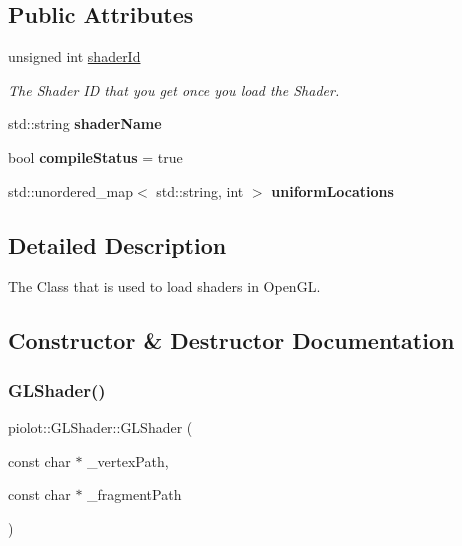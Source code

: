 \subsection*{Public Attributes}
\begin{DoxyCompactItemize}
\item 
\mbox{\label{classpiolot_1_1_g_l_shader_a7f05981084b76212d3ee92c71e002fb2}} 
unsigned int \mbox{\hyperlink{classpiolot_1_1_g_l_shader_a7f05981084b76212d3ee92c71e002fb2}{shader\+Id}}
\begin{DoxyCompactList}\small\item\em The Shader ID that you get once you load the Shader. \end{DoxyCompactList}\item 
\mbox{\label{classpiolot_1_1_g_l_shader_af6cacc0e6d324c39ec3b862dc0ff29a8}} 
std\+::string {\bfseries shader\+Name}
\item 
\mbox{\label{classpiolot_1_1_g_l_shader_aa99f7e5b6b76e8796824278578e4172d}} 
bool {\bfseries compile\+Status} = true
\item 
\mbox{\label{classpiolot_1_1_g_l_shader_adde3ba01aacd0c60bd495ca3b220a1dd}} 
std\+::unordered\+\_\+map$<$ std\+::string, int $>$ {\bfseries uniform\+Locations}
\end{DoxyCompactItemize}


\subsection{Detailed Description}
The Class that is used to load shaders in Open\+GL. 

\subsection{Constructor \& Destructor Documentation}
\mbox{\label{classpiolot_1_1_g_l_shader_a9280ae5003e53461f898dd18b7685eab}} 
\subsubsection{\texorpdfstring{G\+L\+Shader()}{GLShader()}}
{\footnotesize\ttfamily piolot\+::\+G\+L\+Shader\+::\+G\+L\+Shader (\begin{DoxyParamCaption}\item[{const char $\ast$}]{\+\_\+vertex\+Path,  }\item[{const char $\ast$}]{\+\_\+fragment\+Path }\end{DoxyParamCaption})}




